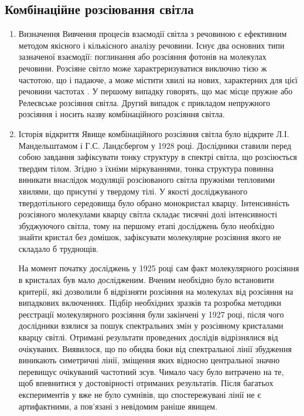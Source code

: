         \subsection{Комбінаційне розсіювання світла}
            \begin{enumerate}
                \item{Визначення}
                    Вивчення процесів взаємодії світла з речовиною є ефективним методом якісного і кількісного аналізу речовини. Існує два основних
                    типи зазначеної взаємодії: поглинання або розсіяння фотонів на молекулах речовини. Розсіяне світло може характреризуватися
                    виключно тією ж частотою, що і падаюче, а може містити хвилі на нових, характерних для цієї речовини частотах . У першому випадку
                    говорять, що має місце пружне або Релеєвське розсіяння світла. Другий випадок є прикладом непружного розсіяння і носить назву
                    комбінаційного розсіяння світла. 
                \item{Історія відкриття}
                    Явище комбінаційного розсіяння світла було відкрите Л.І. Мандельштамом і Г.С. Ландсбергом у 1928 році. Дослідники ставили перед
                    собою завдання зафіксувати тонку структуру в спектрі світла, що розсіюється твердим тілом. Згідно з їхніми міркуваннями, тонка
                    структура повинна виникати внаслідок модуляції розсіюваного світла пружніми тепловими хвилями, що присутні у твердому тілі. У
                    якості досліджуваного твердотільного середовища було обрано монокристал кварцу. Інтенсивність розсіяного молекулами кварцу світла
                    складає тисячні долі інтенсивності збуджуючого світла, тому на першому етапі досліджень було необхідно знайти кристал без домішок,
                    зафіксувати молекулярне розсіяння якого не складало б труднощів. 
                    
                    На момент початку досліджень у 1925 році сам факт молекулярного розсіяння в кристалах був мало дослідженим. Вченим необхідно
                    було встановити критерії, які дозволили б відрізняти розсіяння на молекулах від розсіяння на випадкових включеннях. Підбір
                    необхідних зразків та розробка методики реєстрації молекулярного розсіяння були закінчені у 1927 році, після чого дослідники
                    взялися за пошук спектральних змін у розсіяному кристалами кварцу світлі. Отримані результати проведених дослідів відрізнялися від
                    очікуваних. Виявилося, що по обидва боки від спектральної лінії збудження виникають симетричні лінії, зміщення яких відносно
                    центральної значно перевищує очікуваний частотний зсув. Чимало часу було витрачено на те, щоб впевнитися у достовірності отриманих
                    результатів. Після багатьох експериментів у вже не було сумнівів, що спостережувані лінії не є артифактними, а
                    пов'язані з невідомим раніше явищем.


\end{enumerate}
